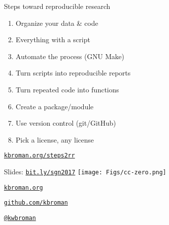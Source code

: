 \documentclass[12pt,t]{beamer}
\begin{document}
\begin{frame}[c]{Steps toward reproducible research}

  \vspace{5mm}

  \begin{enumerate}
  \itemsep10pt
  \item Organize your data \& code
  \item Everything with a script
  \item Automate the process {\lolit (GNU Make)}
  \item Turn scripts into reproducible reports
  \item Turn repeated code into functions
  \item Create a package/module
  \item Use version control {\lolit (git/GitHub)}
  \item Pick a license, any license
  \end{enumerate}

\hfill \href{http://kbroman.org/steps2rr}{\scriptsize \color{lolit} \tt kbroman.org/steps2rr}

\end{frame}



\begin{frame}[c]{}

Slides: \href{http://bit.ly/sgn2017}{\tt bit.ly/sgn2017} \quad
\texttt{[image: Figs/cc-zero.png]}

\vspace{7mm}

\href{http://kbroman.org}{\tt \lolit kbroman.org}

\vspace{7mm}

\href{https://github.com/kbroman}{\tt \lolit github.com/kbroman}

\vspace{7mm}

\href{https://twitter.com/kwbroman}{\tt \lolit @kwbroman}


\end{frame}
\end{document}
